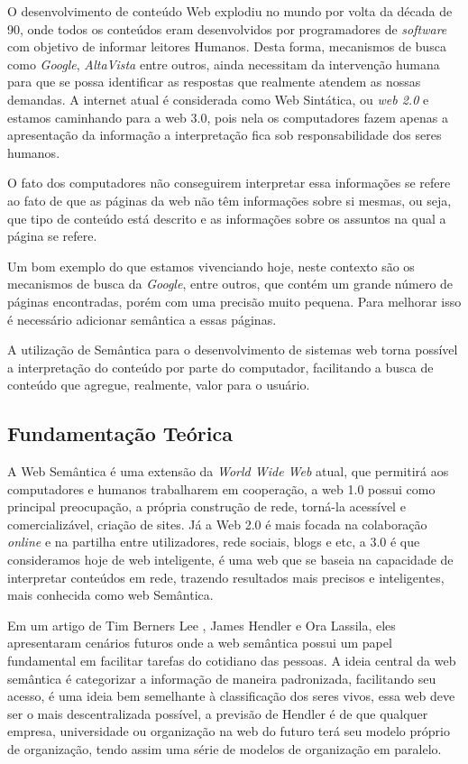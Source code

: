 
O desenvolvimento de conteúdo Web explodiu no mundo por volta da década de 90, onde todos os conteúdos eram desenvolvidos por programadores de \textit{software} com objetivo de informar leitores Humanos. Desta forma, mecanismos de busca como \textit{Google}, \textit{AltaVista} entre outros, ainda necessitam da intervenção humana para que se possa identificar as respostas que realmente atendem as nossas demandas. A internet atual é considerada como Web Sintática, ou \textit{web 2.0} e estamos caminhando para a web 3.0, pois nela os computadores fazem apenas a apresentação da informação a interpretação fica sob responsabilidade dos seres humanos.

O fato dos computadores não conseguirem interpretar essa informações se refere ao fato de que as páginas da web não têm informações sobre si mesmas, ou seja, que tipo de conteúdo está descrito e as informações sobre os assuntos na qual a página se refere.

Um bom exemplo do que estamos vivenciando hoje, neste contexto são os mecanismos de busca da \textit{Google}, entre outros, que contém um grande número de páginas encontradas, porém com uma precisão muito pequena. Para melhorar isso é necessário adicionar semântica a essas páginas.

A utilização de Semântica para o desenvolvimento de sistemas web torna possível a interpretação do conteúdo por parte do computador, facilitando a busca de conteúdo que agregue, realmente, valor para o usuário.


\subsection{Fundamentação Teórica}

A Web Semântica é uma extensão da \textit{World Wide Web} atual, que permitirá aos computadores e humanos trabalharem em cooperação, a web 1.0 possui como principal preocupação, a própria construção de rede, torná-la acessível e comercializável, criação de sites. Já a Web 2.0 é mais focada na colaboração \textit{online} e na partilha entre utilizadores, rede sociais, blogs e etc, a 3.0 é que consideramos hoje de web inteligente, é uma web que se baseia na capacidade de interpretar conteúdos em rede, trazendo resultados mais precisos e inteligentes, mais conhecida como web Semântica.

Em um artigo de Tim Berners Lee \cite{berners2001semantic}, James Hendler e Ora Lassila, eles apresentaram cenários futuros onde a web semântica possui um papel fundamental em facilitar tarefas do cotidiano das pessoas. A ideia central da web semântica é categorizar a informação de maneira padronizada, facilitando seu acesso, é uma ideia bem semelhante à classificação dos seres vivos, essa web deve ser o mais descentralizada possível, a previsão de Hendler é de que qualquer empresa, universidade ou organização na web do futuro terá seu modelo próprio de organização, tendo assim uma série de modelos de organização em paralelo.

